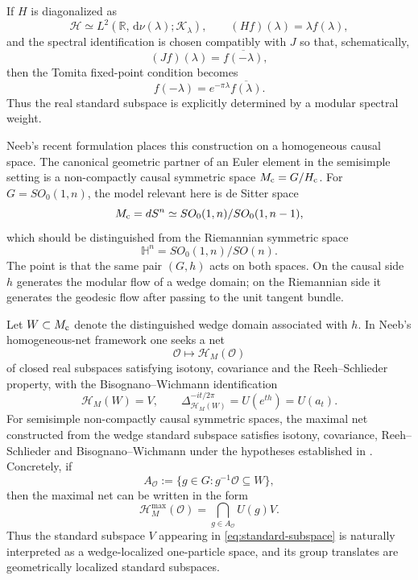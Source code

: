 \documentclass[11pt]{article}
\theoremstyle{definition}
\newcommand{\dd}{\,\mathrm{d}}
\newcommand{\cH}{\mathcal{H}}
\begin{document}
If \(H\) is diagonalized as
\[
\cH\simeq L^2(\mathbb R,\dd\nu(\lambda);\mathcal K_\lambda),
\qquad
(Hf)(\lambda)=\lambda f(\lambda),
\]
and the spectral identification is chosen compatibly with \(J\) so that, schematically,
\[
(Jf)(\lambda)=\overline{f(-\lambda)},
\]
then the Tomita fixed-point condition becomes
\begin{equation}
f(-\lambda)=e^{-\pi\lambda}\overline{f(\lambda)}.
\label{eq:spectral-standard}
\end{equation}
Thus the real standard subspace is explicitly determined by a modular spectral weight.

Neeb's recent formulation places this construction on a homogeneous causal space.  The
canonical geometric partner of an Euler element in the semisimple setting is a
non-compactly causal symmetric space \(M_{\rm c}=G/H_{\rm c}\).  For
\(G=SO_0(1,n)\), the model relevant here is de Sitter space
\begin{equation}
M_{\rm c}=dS^n
\simeq
SO_0(1,n)/SO_0(1,n-1),
\label{eq:de-sitter}
\end{equation}
which should be distinguished from the Riemannian symmetric space
\[
\mathbb H^n=SO_0(1,n)/SO(n).
\]
The point is that the same pair \((G,h)\) acts on both spaces.  On the causal side \(h\)
generates the modular flow of a wedge domain; on the Riemannian side it generates the
geodesic flow after passing to the unit tangent bundle.

Let \(W\subset M_{\rm c}\) denote the distinguished wedge domain associated with \(h\).
In Neeb's homogeneous-net framework one seeks a net
\[
\mathcal O\longmapsto \cH_M(\mathcal O)
\]
of closed real subspaces satisfying isotony, covariance and the Reeh--Schlieder
property, with the Bisognano--Wichmann identification
\begin{equation}
\cH_M(W)=V,\qquad
\Delta_{\cH_M(W)}^{-it/2\pi}=U(e^{th})=U(a_t).
\label{eq:BW}
\end{equation}
For semisimple non-compactly causal symmetric spaces, the maximal net constructed from
the wedge standard subspace satisfies isotony, covariance, Reeh--Schlieder and
Bisognano--Wichmann under the hypotheses established in
\cite{Neeb2025,FNO2025}.  Concretely, if
\[
A_{\mathcal O}:=
\{g\in G:g^{-1}\mathcal O\subseteq W\},
\]
then the maximal net can be written in the form
\begin{equation}
\cH_M^{\max}(\mathcal O)
=
\bigcap_{g\in A_{\mathcal O}}U(g)V.
\label{eq:maximal-net}
\end{equation}
Thus the standard subspace \(V\) appearing in \eqref{eq:standard-subspace} is naturally
interpreted as a wedge-localized one-particle space, and its group translates are
geometrically localized standard subspaces.
\end{document}
